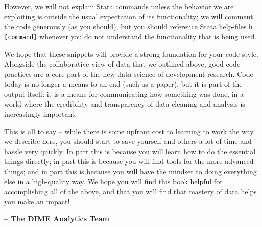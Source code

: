 However, we will not explain Stata commands unless the behavior we are exploiting
is outside the usual expectation of its functionality;
we will comment the code generously (as you should),
but you should reference Stata help-files \texttt{h [command]}
whenever you do not understand the functionality that is being used.

We hope that these snippets will provide a strong foundation for your code style.
Alongside the collaborative view of data that we outlined above,
good code practices are a core part of the new data science of development research.
Code today is no longer a means to an end (such as a paper),
but it is part of the output itself: it is a means for communicating how something was done,
in a world where the credibility and transparency of data cleaning and analysis is increasingly important.

This is all to say -- while there is some upfront cost to learning to work the way we describe here,
you should start to save yourself and others a lot of time and hassle very quickly.
In part this is because you will learn how to do the essential things directly;
in part this is because you will find tools for the more advanced things;
and in part this is because you will have the mindset to doing everything else in a high-quality way.
We hope you will find this book helpful for accomplishing all of the above,
and that you will find that mastery of data helps you make an impact!

\textbf{-- The DIME Analytics Team}

\mainmatter
